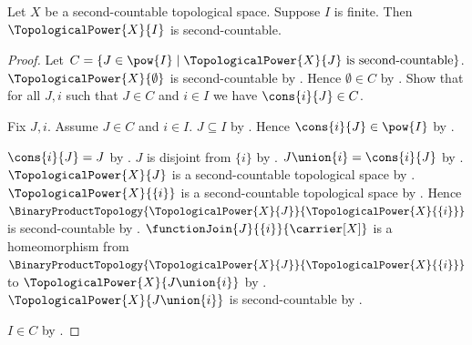 \begin{theorem}\label{finite_topological_power_is_second_countable}
    Let $X$ be a second-countable topological space.
    Suppose $I$ is finite.
    Then $\TopologicalPower{X}{I}$ is second-countable.
\end{theorem}
\begin{proof}
    Let $C=\{J\in\pow{I}\mid\text{$\TopologicalPower{X}{J}$ is second-countable}\}$.
    $\TopologicalPower{X}{\emptyset}$ is second-countable by
        .
    Hence $\emptyset\in C$ by .
    Show that for all $J,i$ such that $J\in C$ and $i\in I$ we have $\cons{i}{J}\in C$.
    \begin{subproof}
        Fix $J,i$.
        Assume $J\in C$ and $i\in I$.
        $J\subseteq I$ by .
        Hence $\cons{i}{J}\in\pow{I}$ by .
        \begin{byCase}
                $\cons{i}{J}=J$ by .
                $J$ is disjoint from $\{i\}$ by .
                $J\union\{i\}=\cons{i}{J}$ by .
                $\TopologicalPower{X}{J}$ is a second-countable topological space by
                    .
                $\TopologicalPower{X}{\{i\}}$ is a second-countable topological space by
                    .
                Hence $\BinaryProductTopology{\TopologicalPower{X}{J}}{\TopologicalPower{X}{\{i\}}}$
                    is second-countable by .
                $\functionJoin{J}{\{i\}}{\carrier[X]}$ is a homeomorphism from
                    $\BinaryProductTopology{\TopologicalPower{X}{J}}{\TopologicalPower{X}{\{i\}}}$
                    to $\TopologicalPower{X}{J\union\{i\}}$ by .
                $\TopologicalPower{X}{J\union\{i\}}$ is second-countable by
                    .
        \end{byCase}
    \end{subproof}
    $I\in C$ by .
\end{proof}
